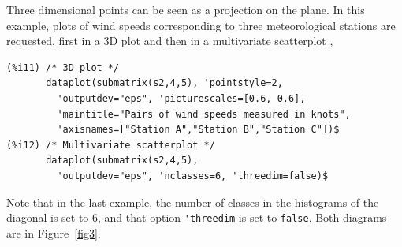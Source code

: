 \documentclass[12pt,a4paper]{article}
\begin{document}
\begin{description}
Three dimensional points can be seen as a projection on the plane. In this example, plots of wind speeds corresponding to  three meteorological stations are requested, first in a 3D plot and then in a multivariate scatterplot \cite{john}, 
\begin{verbatim}
(%i11) /* 3D plot */
       dataplot(submatrix(s2,4,5), 'pointstyle=2,
         'outputdev="eps", 'picturescales=[0.6, 0.6],
         'maintitle="Pairs of wind speeds measured in knots",
         'axisnames=["Station A","Station B","Station C"])$
(%i12) /* Multivariate scatterplot */
       dataplot(submatrix(s2,4,5),
         'outputdev="eps", 'nclasses=6, 'threedim=false)$
\end{verbatim}
Note that in the last example, the number of classes in the histograms of the diagonal is set to 6, and that option \verb|'threedim| is set to \verb|false|. Both diagrams are in Figure~\ref{fig3}.



\end{description}
\end{document}

